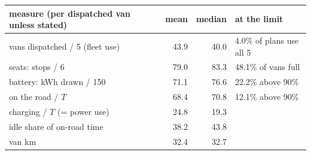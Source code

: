 \begin{tabular}{lrrl}\toprule
measure (per dispatched van unless stated) & mean & median & at the limit \\ \midrule
vans dispatched / 5 (fleet use) & 43.9 & 40.0 & 4.0\% of plans use all 5 \\
seats: stops / 6 & 79.0 & 83.3 & 48.1\% of vans full \\
battery: kWh drawn / 150 & 71.1 & 76.6 & 22.2\% above 90\% \\
on the road / $T$ & 68.4 & 70.8 & 12.1\% above 90\% \\
charging / $T$ (= power use) & 24.8 & 19.3 &  \\
idle share of on-road time & 38.2 & 43.8 &  \\
van km & 32.4 & 32.7 &  \\
\bottomrule\end{tabular}
